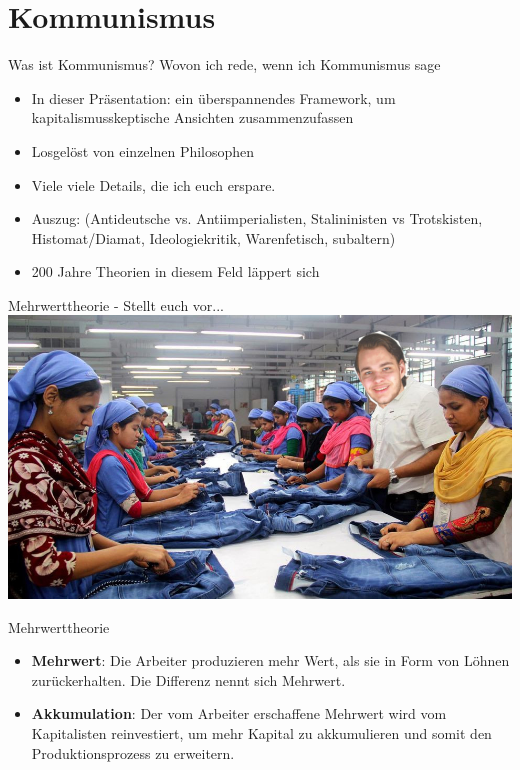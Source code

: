 \documentclass{beamer}
\begin{document}
\section{Kommunismus}
\begin{frame}{Was ist Kommunismus?}
Wovon ich rede, wenn ich Kommunismus sage
\end{frame}
\begin{frame}
\begin{itemize}
\item In dieser Präsentation: ein überspannendes Framework, um kapitalismusskeptische Ansichten zusammenzufassen
\item Losgelöst von einzelnen Philosophen
\item Viele viele Details, die ich euch erspare.
\item Auszug: (Antideutsche vs. Antiimperialisten, Stalininisten vs Trotskisten, Histomat/Diamat, Ideologiekritik, Warenfetisch, subaltern)
\item 200 Jahre Theorien in diesem Feld läppert sich
\end{itemize}
\end{frame}
\begin{frame}{Mehrwerttheorie - Stellt euch vor...}
\includegraphics[width=\textwidth]{naeherinnen.jpg}
\end{frame}
\begin{frame}{Mehrwerttheorie}
\begin{itemize}
    \item \textbf{Mehrwert}: Die Arbeiter produzieren mehr Wert, als sie in Form von Löhnen zurückerhalten. Die Differenz nennt sich Mehrwert.
    \item \textbf{Akkumulation}: Der vom Arbeiter erschaffene Mehrwert wird vom Kapitalisten reinvestiert, um mehr Kapital zu akkumulieren und somit den Produktionsprozess zu erweitern.
\end{itemize}
\end{frame}
\end{document}
